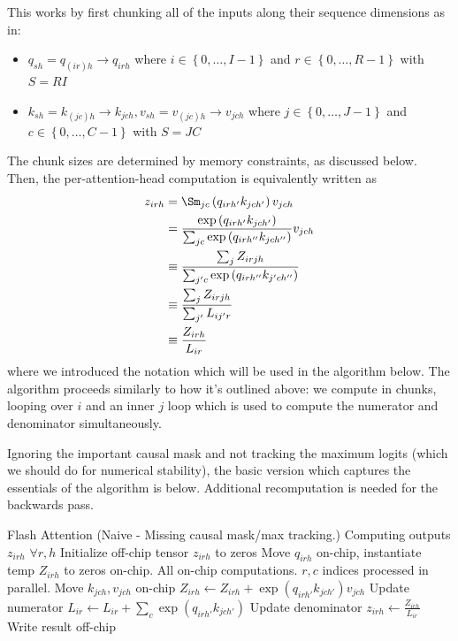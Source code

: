 This works by first chunking all of the inputs along their sequence dimensions as in:
\begin{itemize}
    \item $  q _{ sh } =q _{ (ir)h }\longrightarrow  q _{ irh }  $ where $ i \in \left \{ 0, \ldots
        , I-1 \right \} $ and $ r \in \left \{ 0, \ldots , R-1 \right \} $ with $ S=RI $
    \item $ k _{ sh } = k _{ (jc)h } \longrightarrow  k _{jch} , v _{ sh } = v _{ (jc)h }
        \longrightarrow  v _{jch} $ where $ j \in \left \{ 0, \ldots , J-1 \right \} $ and $ c \in
        \left \{ 0, \ldots , C-1 \right \} $ with $ S=JC $
\end{itemize}
The chunk sizes are determined by memory constraints, as discussed below.  Then, the
per-attention-head computation is equivalently written as
\begin{align}
    z _{irh} &= \Sm _{jc} \left ( q _{ irh' } k _{ jch' }  \right ) v _{ jch } \nn
             &= \frac{ \exp \left (  q _{ irh' } k _{ jch' }  \right ) }{ \sum _{ jc }\exp \left ( q _{ irh'' } k _{ jch'' } \right ) } v _{ jch }\nn
             &\equiv \frac{\sum _{ j } Z _{ irjh } }{   \sum _{ j'c } \exp \left(q _{ irh'' } k _{ j'ch'' }\right) }\nn
             &\equiv \frac{\sum _{ j } Z _{ irjh } }{\sum _{ j' }L _{ ij'r }}\nn
             &\equiv \frac{ Z _{ irh } }{L _{ ir }}\nn
\end{align}
where we introduced the notation which will be used in the algorithm below. The algorithm proceeds
similarly to how it's outlined above: we compute in chunks, looping over $ i $ and an inner $ j$
loop which is used to compute the numerator and denominator simultaneously.

Ignoring the important causal mask and not tracking the maximum logits (which we should do for
numerical stability), the basic version which captures the essentials of the algorithm is below.
Additional recomputation is needed for the backwards pass.

\begin{algo}{Flash Attention (Naive - Missing causal mask/max tracking.)}
 \Comment Computing outputs $ z _{ irh } $ $ \forall r, h $
\State Initialize off-chip tensor $ z _{ irh }$ to zeros
\State Move  $ q _{ irh }$ on-chip, instantiate temp $Z _{ irh }$ to zeros on-chip.
\Comment All on-chip computations. $ r, c $ indices processed in parallel.
    \State Move  $ k_{ jch },v _{ jch }$ on-chip
    \State $ Z _{ irh } \gets   Z _{ irh } +\exp \left ( q _{ irh' } k _{ jch' }  \right ) v _{ jch }$ \Comment Update numerator
    \State $ L _{ ir } \gets   L _{ ir } +\sum _{ c }\exp \left ( q _{ irh' } k _{ jch' }  \right ) $ \Comment Update denominator
\EndFor
\State $ z _{ irh } \gets \frac{Z _{ irh }}{L _{ ir }}$ \Comment Write result off-chip
\EndFor
\label{algo_fa_fwd_basic}
\end{algo}

